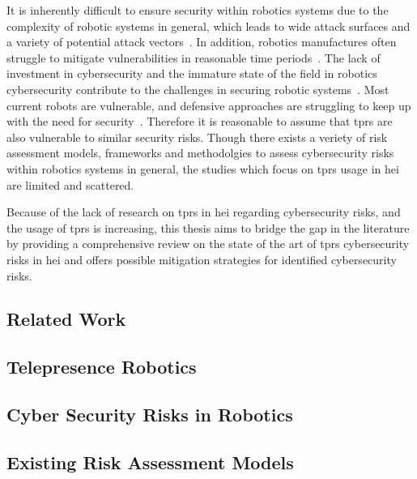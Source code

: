 It is inherently difficult to ensure security within robotics systems due to the complexity of robotic systems in general, which leads to
wide
attack surfaces
and a variety
of potential attack vectors~\cite[2]{robot_security_review_2022}. In addition, robotics manufactures often struggle to mitigate
vulnerabilities in reasonable time periods~\cite[12]{robot_security_review_2022}. The lack of investment in cybersecurity and the
immature state of the field in robotics cybersecurity contribute to the challenges in securing robotic systems~\cite[12]{
  robot_security_review_2022}. Most current robots are vulnerable, and defensive approaches
are
struggling
to keep up with the need for security~\cite[12]{robot_security_review_2022}. Therefore it is reasonable to assume that \ac{tprs} are also
vulnerable to similar security risks. Though there exists a veriety of risk assessment models, frameworks and methodolgies to assess
cybersecurity risks within robotics systems in general, the studies which focus on \ac{tprs} usage in \ac{hei} are limited and scattered.

Because of the lack of research on \ac{tprs} in \ac{hei} regarding cybersecurity risks, and the usage of \ac{tprs}
is increasing, this thesis aims to bridge the gap in the literature by providing a comprehensive review on the state of the art of
\ac{tprs} cybersecurity risks in \ac{hei} and offers possible mitigation strategies for identified cybersecurity risks.

\subsection{Related Work}

\subsection{Telepresence Robotics}


\subsection{Cyber Security Risks in Robotics}


\subsection{Existing Risk Assessment Models}

